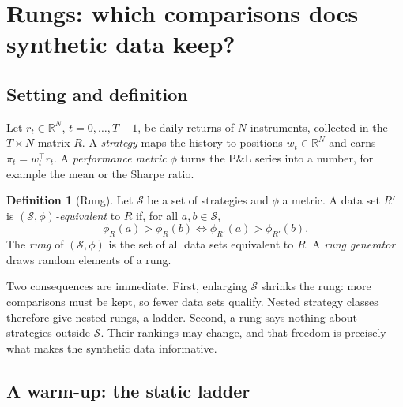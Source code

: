 \documentclass[11pt]{article}
\theoremstyle{definition}
\newtheorem{definition}{Definition}
\theoremstyle{remark}
\newcommand{\R}{\mathbb{R}}
\begin{document}
\section{Rungs: which comparisons does synthetic data keep?}
\label{sec:rungs}

\subsection{Setting and definition}

Let $r_t\in\R^N$, $t=0,\dots,T-1$, be daily returns of $N$ instruments, collected in the $T\times N$ matrix $R$.
A \emph{strategy} maps the history to positions $w_t\in\R^N$ and earns $\pi_t=w_t^\top r_t$. A \emph{performance
metric} $\phi$ turns the P\&L series into a number, for example the mean or the Sharpe ratio.

\begin{definition}[Rung]\label{def:rung}
Let $\mathcal{S}$ be a set of strategies and $\phi$ a metric. A data set $R'$ is \emph{$(\mathcal{S},\phi)$-equivalent}
to $R$ if, for all $a,b\in\mathcal{S}$,
\[
  \phi_R(a) > \phi_R(b) \iff \phi_{R'}(a) > \phi_{R'}(b).
\]
The \emph{rung} of $(\mathcal{S},\phi)$ is the set of all data sets equivalent to $R$. A \emph{rung generator} draws random elements of a rung.
\end{definition}

Two consequences are immediate. First, enlarging $\mathcal{S}$ shrinks the rung: more comparisons must be kept, so fewer
data sets qualify. Nested strategy classes therefore give nested rungs, a ladder. Second, a rung says nothing about
strategies outside $\mathcal{S}$. Their rankings may change, and that freedom is precisely what makes the synthetic data
informative.

\subsection{A warm-up: the static ladder}
\label{sec:static}
\end{document}
